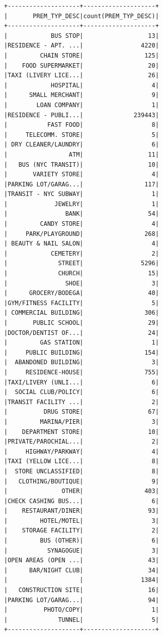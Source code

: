\documentclass{article}
\begin{document}
\begin{itemize}
\begin{verbatim}
+--------------------+--------------------+
|       PREM_TYP_DESC|count(PREM_TYP_DESC)|
+--------------------+--------------------+
|            BUS STOP|                  13|
|RESIDENCE - APT. ...|                4220|
|         CHAIN STORE|                 125|
|    FOOD SUPERMARKET|                  20|
|TAXI (LIVERY LICE...|                  26|
|            HOSPITAL|                   4|
|      SMALL MERCHANT|                   9|
|        LOAN COMPANY|                   1|
|RESIDENCE - PUBLI...|              239443|
|           FAST FOOD|                   8|
|     TELECOMM. STORE|                   5|
| DRY CLEANER/LAUNDRY|                   6|
|                 ATM|                  11|
|   BUS (NYC TRANSIT)|                  10|
|       VARIETY STORE|                   4|
|PARKING LOT/GARAG...|                 117|
|TRANSIT - NYC SUBWAY|                   1|
|             JEWELRY|                   1|
|                BANK|                  54|
|         CANDY STORE|                   4|
|     PARK/PLAYGROUND|                 268|
| BEAUTY & NAIL SALON|                   4|
|            CEMETERY|                   2|
|              STREET|                5296|
|              CHURCH|                  15|
|                SHOE|                   3|
|      GROCERY/BODEGA|                  40|
|GYM/FITNESS FACILITY|                   5|
| COMMERCIAL BUILDING|                 306|
|       PUBLIC SCHOOL|                  29|
|DOCTOR/DENTIST OF...|                  24|
|         GAS STATION|                   1|
|     PUBLIC BUILDING|                 154|
|  ABANDONED BUILDING|                   3|
|     RESIDENCE-HOUSE|                 755|
|TAXI/LIVERY (UNLI...|                   6|
|  SOCIAL CLUB/POLICY|                   6|
|TRANSIT FACILITY ...|                   2|
|          DRUG STORE|                  67|
|         MARINA/PIER|                   3|
|    DEPARTMENT STORE|                  10|
|PRIVATE/PAROCHIAL...|                   2|
|     HIGHWAY/PARKWAY|                   4|
|TAXI (YELLOW LICE...|                   8|
|  STORE UNCLASSIFIED|                   8|
|   CLOTHING/BOUTIQUE|                   9|
|               OTHER|                 403|
|CHECK CASHING BUS...|                   6|
|    RESTAURANT/DINER|                  93|
|         HOTEL/MOTEL|                   3|
|    STORAGE FACILITY|                   2|
|         BUS (OTHER)|                   6|
|           SYNAGOGUE|                   3|
|OPEN AREAS (OPEN ...|                  43|
|      BAR/NIGHT CLUB|                  34|
|                    |                1384|
|   CONSTRUCTION SITE|                  16|
|PARKING LOT/GARAG...|                  94|
|          PHOTO/COPY|                   1|
|              TUNNEL|                   5|
+--------------------+--------------------+
\end{verbatim}


\end{itemize}
\end{document}
